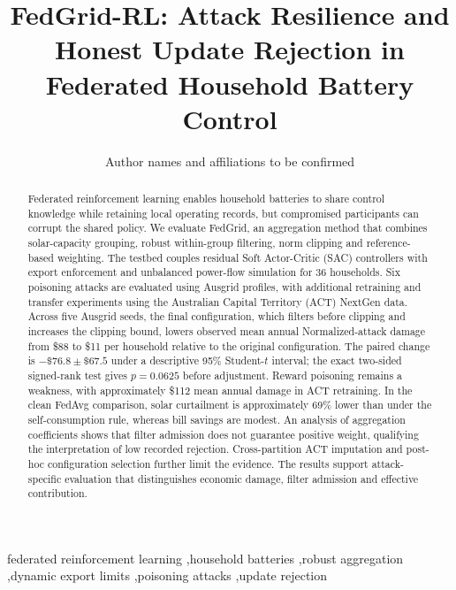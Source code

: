 \documentclass[preprint,12pt,a4paper]{elsarticle}
\begin{document}
\begin{frontmatter}
\title{FedGrid-RL: Attack Resilience and Honest Update Rejection in Federated Household Battery Control}
\author{Author names and affiliations to be confirmed}
\begin{abstract}

Federated reinforcement learning enables household batteries to share control knowledge while retaining local operating records, but compromised participants can corrupt the shared policy. We evaluate FedGrid, an aggregation method that combines solar-capacity grouping, robust within-group filtering, norm clipping and reference-based weighting. The testbed couples residual Soft Actor-Critic (SAC) controllers with export enforcement and unbalanced power-flow simulation for 36 households. Six poisoning attacks are evaluated using Ausgrid profiles, with additional retraining and transfer experiments using the Australian Capital Territory (ACT) NextGen data. Across five Ausgrid seeds, the final configuration, which filters before clipping and increases the clipping bound, lowers observed mean annual Normalized-attack damage from \$88 to \$11 per household relative to the original configuration. The paired change is $-\$76.8\pm\$67.5$ under a descriptive 95\% Student-$t$ interval; the exact two-sided signed-rank test gives $p=0.0625$ before adjustment. Reward poisoning remains a weakness, with approximately \$112 mean annual damage in ACT retraining. In the clean FedAvg comparison, solar curtailment is approximately 69\% lower than under the self-consumption rule, whereas bill savings are modest. An analysis of aggregation coefficients shows that filter admission does not guarantee positive weight, qualifying the interpretation of low recorded rejection. Cross-partition ACT imputation and post-hoc configuration selection further limit the evidence. The results support attack-specific evaluation that distinguishes economic damage, filter admission and effective contribution.


\end{abstract}
\begin{keyword}
federated reinforcement learning \sep household batteries \sep robust aggregation \sep dynamic export limits \sep poisoning attacks \sep update rejection
\end{keyword}
\end{frontmatter}

\end{document}

